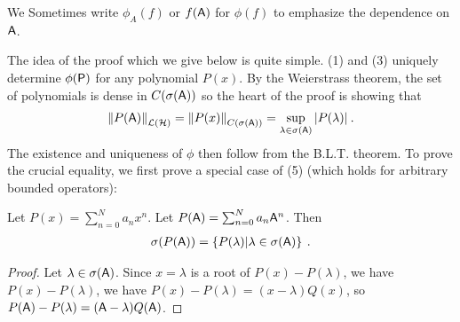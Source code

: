 We Sometimes write  $\phi_A(f)$ or $f(\mathsf{A})$ for $\phi(f)$ to emphasize the dependence on $\mathsf{A}$.

The idea of the proof which we give below is quite simple. (1) and (3) uniquely determine $\phi(\mathsf{P})$ for any polynomial $P(x)$. By the Weierstrass theorem, the set of polynomials is dense in $C(\sigma( \mathsf{A}))$ so the heart of the proof is showing that
\begin{align}
    \left \Vert P(\mathsf{A}) \right \Vert_{\mathcal{L}(\mathcal{H})} = \left \Vert P(x) \right \Vert_{C(\sigma(\mathsf{A})) } = \sup_{\lambda \in \sigma(\mathsf{A})} |P(\lambda)| \:.
\end{align}
The existence and uniqueness of $\phi$ then follow from the B.L.T. theorem.
To prove the crucial equality, we first prove a special case of (5) (which holds for arbitrary bounded operators):

\begin{lemma}
    Let $P(x) = \sum_{n=0}^N a_n x^n$. Let $P(\mathsf{A}) = \sum_{n=0}^N a_n \mathsf{A}^n$. Then \begin{align}
        \sigma(P(\mathsf{A})) = \left \lbrace P(\lambda) | \lambda \in \sigma(\mathsf{A}) \right \rbrace \:.
    \end{align}
\end{lemma}

\begin{proof}
    Let $\lambda \in \sigma(\mathsf{A})$. Since $x = \lambda$ is a root of $P(x) - P(\lambda)$, we have $P(x) - P(\lambda)$, we have $P(x)- P(\lambda) = (x-\lambda) Q(x)$, so $P(\mathsf{A}) - P(\lambda) = (\mathsf{A} - \lambda) Q(\mathsf{A})$.
\end{proof}
